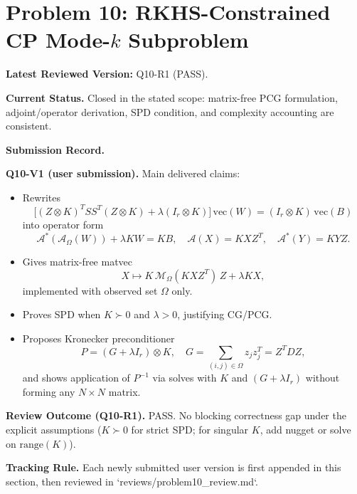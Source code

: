 \section{Problem 10: RKHS-Constrained CP Mode-$k$ Subproblem}

\textbf{Latest Reviewed Version:} Q10-R1 (PASS).

\textbf{Current Status.}
Closed in the stated scope: matrix-free PCG formulation, adjoint/operator derivation, SPD condition, and complexity accounting are consistent.

\textbf{Submission Record.}

\textbf{Q10-V1 (user submission).}
Main delivered claims:
\begin{itemize}
\item Rewrites
\[
\big[(Z\otimes K)^T SS^T (Z\otimes K)+\lambda(I_r\otimes K)\big]\,\mathrm{vec}(W)
=(I_r\otimes K)\,\mathrm{vec}(B)
\]
into operator form
\[
\mathcal A^*(\mathcal A_\Omega(W)) + \lambda K W = K B,
\quad \mathcal A(X)=KXZ^T,
\quad \mathcal A^*(Y)=KYZ.
\]
\item Gives matrix-free matvec
\[
X\mapsto K\,\mathcal M_\Omega(KXZ^T)\,Z + \lambda KX,
\]
implemented with observed set $\Omega$ only.
\item Proves SPD when $K\succ0$ and $\lambda>0$, justifying CG/PCG.
\item Proposes Kronecker preconditioner
\[
P=(G+\lambda I_r)\otimes K,
\quad G=\sum_{(i,j)\in\Omega} z_j z_j^T = Z^T D Z,
\]
and shows application of $P^{-1}$ via solves with $K$ and $(G+\lambda I_r)$ without forming any $N\times N$ matrix.
\end{itemize}

\textbf{Review Outcome (Q10-R1).}
PASS. No blocking correctness gap under the explicit assumptions ($K\succ0$ for strict SPD; for singular $K$, add nugget or solve on $\mathrm{range}(K)$).

\textbf{Tracking Rule.}
Each newly submitted user version is first appended in this section, then reviewed in `reviews/problem10_review.md`.

